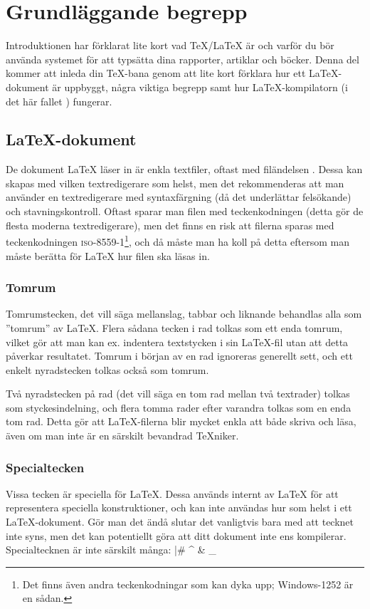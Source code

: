 \documentclass[lang=sv,ptsize=10pt,font=none,nomath,titles=bf,../../a4.tex]{subfiles}
\begin{document}
\section{Grundläggande begrepp}\label{sec:1}
Introduktionen har förklarat lite kort vad \TeX/\LaTeX{} är och varför du
bör använda systemet för att typsätta dina rapporter, artiklar och böcker.
Denna del kommer att inleda din \TeX-bana genom att lite kort förklara hur
ett \LaTeX-dokument är uppbyggt, några viktiga begrepp samt hur
\LaTeX-kompilatorn (i det här fallet ) fungerar.

\subsection{\LaTeX-dokument}
De dokument \LaTeX{} läser in är enkla textfiler, oftast med filändelsen
. Dessa kan skapas med vilken textredigerare som helst,
men det rekommenderas att man använder
en textredigerare med syntaxfärgning (då det underlättar felsökande) och
stavningskontroll. Oftast sparar man filen med teckenkodningen \UTF{} 
(detta gör de flesta moderna textredigerare), men det finns en risk att
filerna sparas med teckenkodningen \textsc{iso-8559-1}\footnote{Det finns 
även andra teckenkodningar som kan dyka upp; Windows-1252 är en sådan.}, 
och då måste man ha koll på detta eftersom man måste berätta för \LaTeX{}
hur filen ska läsas in.

\subsubsection{Tomrum}
Tomrumstecken, det vill säga mellanslag, tabbar och liknande behandlas
alla som ”tomrum” av \LaTeX{}. Flera sådana tecken i rad tolkas som ett
enda tomrum, vilket gör att man kan ex. indentera textstycken i sin
\LaTeX-fil utan att detta påverkar resultatet. Tomrum i början av en rad
ignoreras generellt sett, och ett enkelt nyradstecken tolkas också som
tomrum.

Två nyradstecken på rad (det vill säga en tom rad mellan två textrader) tolkas som
styckesindelning, och flera tomma rader efter varandra tolkas som en enda
tom rad. Detta gör att \LaTeX{}-filerna blir mycket enkla att både skriva
och läsa, även om man inte är en särskilt bevandrad \TeX{}niker.

\subsubsection{Specialtecken}
Vissa tecken är speciella för \LaTeX{}. Dessa används internt av \LaTeX{} 
för att representera speciella konstruktioner, och kan inte användas hur som helst i ett \LaTeX-dokument. Gör man det ändå
slutar det vanligtvis bara med att tecknet inte syns, men det kan
potentiellt göra att ditt dokument inte ens kompilerar. Specialtecknen
är inte särskilt många:
\latex|# ^ & _ { } ~ \ %
\end{document}

